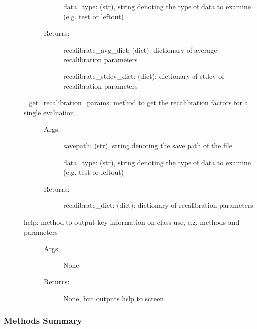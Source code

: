 \documentclass[letterpaper,10pt,english]{sphinxmanual}
\begin{document}
\begin{fulllineitems}
\begin{description}
\begin{description}
\begin{description}
data\_type: (str), string denoting the type of data to examine (e.g. test or leftout)

\item[{Returns:}] \leavevmode
recalibrate\_avg\_dict: (dict): dictionary of average recalibration parameters

recalibrate\_stdev\_dict: (dict): dictionary of stdev of recalibration parameters

\end{description}

\item[{\_get\_recalibration\_params: method to get the recalibration factors for a single evaluation}] \leavevmode\begin{description}
\item[{Args:}] \leavevmode
savepath: (str), string denoting the save path of the file

data\_type: (str), string denoting the type of data to examine (e.g. test or leftout)

\item[{Returns:}] \leavevmode
recalibrate\_dict: (dict): dictionary of recalibration parameters

\end{description}

\item[{help: method to output key information on class use, e.g. methods and parameters}] \leavevmode\begin{description}
\item[{Args:}] \leavevmode
None

\item[{Returns:}] \leavevmode
None, but outputs help to screen

\end{description}

\end{description}

\end{description}
\subsubsection*{Methods Summary}


\begin{savenotes}\sphinxatlongtablestart\begin{longtable}[c]{}
\hline

\endfirsthead

%
{}\\
\hline


\end{longtable}
\end{savenotes}
\end{fulllineitems}
\end{document}
